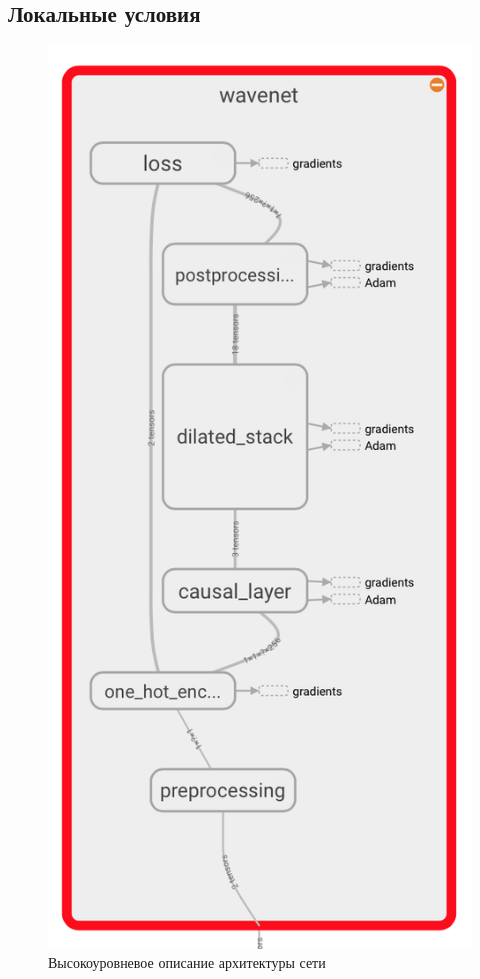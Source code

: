 \documentclass[../diploma.tex]{subfiles}
\begin{document}
\subsection{Локальные условия}




\begin{figure}[ht!]
  \includegraphics[scale=0.9]{img/network}
  \caption{Высокоуровневое описание архитектуры сети}
  \label{fig:arch_high}
\end{figure}
\end{document}
